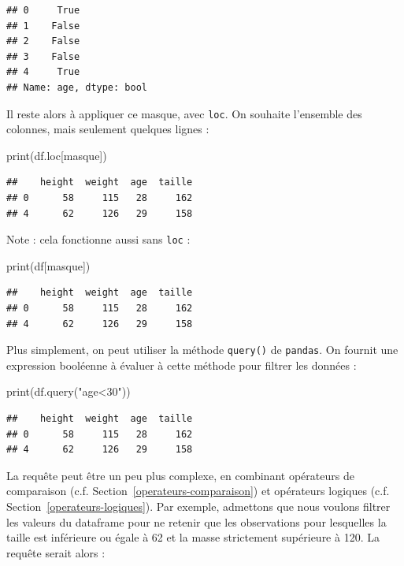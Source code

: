 \documentclass[12pt,]{book}
\newenvironment{Shaded}{\begin{snugshade}}{\end{snugshade}}
\newcommand{\StringTok}[1]{\textcolor[rgb]{0.31,0.60,0.02}{#1}}
\newcommand{\BuiltInTok}[1]{#1}
\newcommand{\NormalTok}[1]{#1}
\numberwithin{equation}{section}
\numberwithin{countremarque}{section}
\begin{document}
\begin{lstlisting}
## 0     True
## 1    False
## 2    False
## 3    False
## 4     True
## Name: age, dtype: bool
\end{lstlisting}

Il reste alors à appliquer ce masque, avec \texttt{loc}. On souhaite
l'ensemble des colonnes, mais seulement quelques lignes :

\begin{Shaded}
\begin{Highlighting}[]
\BuiltInTok{print}\NormalTok{(df.loc[masque])}
\end{Highlighting}
\end{Shaded}

\begin{lstlisting}
##    height  weight  age  taille
## 0      58     115   28     162
## 4      62     126   29     158
\end{lstlisting}

Note : cela fonctionne aussi sans \texttt{loc} :

\begin{Shaded}
\begin{Highlighting}[]
\BuiltInTok{print}\NormalTok{(df[masque])}
\end{Highlighting}
\end{Shaded}

\begin{lstlisting}
##    height  weight  age  taille
## 0      58     115   28     162
## 4      62     126   29     158
\end{lstlisting}

Plus simplement, on peut utiliser la méthode \texttt{query()} de
\texttt{pandas}. On fournit une expression booléenne à évaluer à cette
méthode pour filtrer les données :

\begin{Shaded}
\begin{Highlighting}[]
\BuiltInTok{print}\NormalTok{(df.query(}\StringTok{"age<30"}\NormalTok{))}
\end{Highlighting}
\end{Shaded}

\begin{lstlisting}
##    height  weight  age  taille
## 0      58     115   28     162
## 4      62     126   29     158
\end{lstlisting}

La requête peut être un peu plus complexe, en combinant opérateurs de
comparaison (c.f. Section~\ref{operateurs-comparaison}) et opérateurs
logiques (c.f. Section~\ref{operateurs-logiques}). Par exemple,
admettons que nous voulons filtrer les valeurs du dataframe pour ne
retenir que les observations pour lesquelles la taille est inférieure ou
égale à 62 et la masse strictement supérieure à 120. La requête serait
alors :
\end{document}
